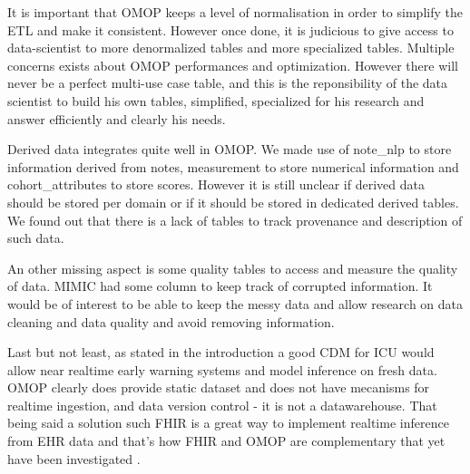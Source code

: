 
It is important that OMOP keeps a level of normalisation in order to simplify
the ETL and make it consistent. However once done, it is judicious to give
access to data-scientist to more denormalized tables and more specialized
tables. Multiple concerns exists about OMOP performances and optimization.
However there will never be a perfect multi-use case table, and this is the
reponsibility of the data scientist to build his own tables, simplified,
specialized for his research and answer efficiently and clearly his needs.

Derived data integrates quite well in OMOP. We made use of note\_nlp to store
information derived from notes, measurement to store numerical information and
cohort_attributes to store scores. However it is still unclear if derived data
should be stored per domain or if it should be stored in dedicated derived
tables. We found out that there is a lack of tables to track provenance and
description of such data.

An other missing aspect is some quality tables to access and measure the
quality of data. MIMIC had some column to keep track of corrupted information.
It would be of interest to be able to keep the messy data and allow research on
data cleaning and data quality and avoid removing information.

Last but not least, as stated in the introduction a good CDM for ICU would
allow near realtime early warning systems and model inference on fresh data.
OMOP clearly does provide static dataset and does not have mecanisms for
realtime ingestion, and data version control - it is not a datawarehouse. That
being said a solution such FHIR is a great way to implement realtime inference
from EHR data and that's how FHIR and OMOP are complementary that yet have been
investigated \cite{gatech}.
